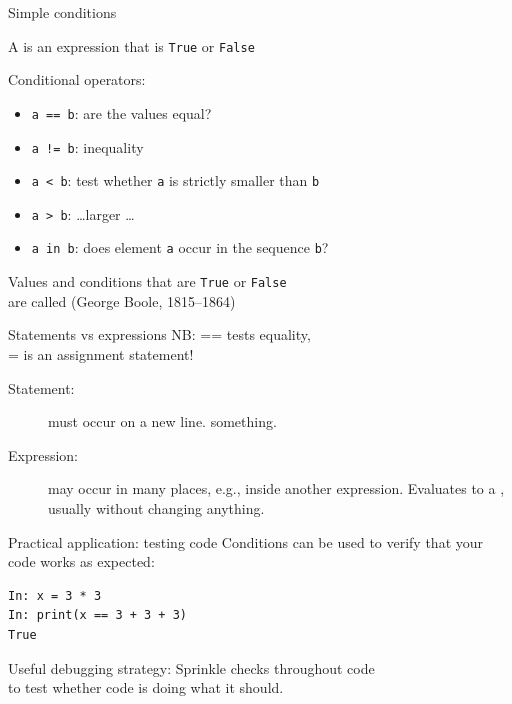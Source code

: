 \documentclass[aspectratio=169,usenames,dvipsnames]{beamer}
\begin{document}
\begin{frame}{Simple conditions}
    \begin{definition}
        A  is
        an expression that is \lstinline{True} or \lstinline{False}
    \end{definition}
    Conditional operators:
    \begin{itemize}
        \item \lstinline{a == b}: are the values equal?
        \item \lstinline{a != b}: inequality
        \item \lstinline{a < b}: test whether \lstinline{a}
                is strictly smaller than \lstinline{b}
        \item \lstinline{a > b}: \dots larger \dots
        \item \lstinline{a in b}: does element \lstinline{a} occur
                in the sequence \lstinline{b}?
    \end{itemize}

    Values and conditions that are \lstinline{True} or \lstinline{False} \\
    are called  (George Boole, 1815--1864)
\end{frame}

\begin{frame}{Statements vs expressions}
    NB: == tests equality, \\
           = is an assignment statement!

    \vspace{1em}
    \begin{description}
        \item[Statement:] must occur on a new line.  something.
        \item[Expression:] may occur in many places, e.g., inside another expression.
            Evaluates to a , usually without changing anything.
    \end{description}
\end{frame}

\begin{frame}[fragile]{Practical application: testing code}
Conditions can be used to verify that your code works as expected:
\begin{lstlisting}
In: x = 3 * 3
In: print(x == 3 + 3 + 3)
True
\end{lstlisting}

\begin{block}{Useful debugging strategy:}
Sprinkle checks throughout code \\
to test whether code is doing what it should.
\end{block}
\end{frame}
\end{document}
